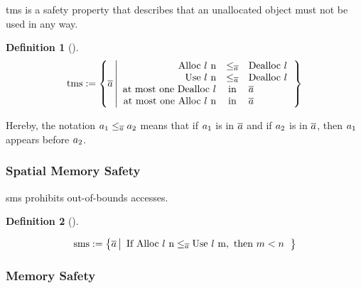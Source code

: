 \documentclass[dvipsnames,conference]{IEEEtran}
\theoremstyle{definition}
\newtheorem{definition}{Definition}[section]
\begin{document}
\gls*{tms} is a safety property that describes that an unallocated object must not be used in any way.

\begin{definition}[]\label{def:trace:tmsdef}
  $$
  \tmssafe:=\left\{\trace \left| \begin{array}{rcl}
                              \ev{Alloc\ \loc\ n}&\le_{\trace}&\ev{Dealloc\ \loc} \\
                              \ev{Use\ \loc\ n}&\le_{\trace}&\ev{Dealloc\ \loc} \\
                              \text{at most one }\ev{Dealloc\ \loc}&\text{in}&\trace \\
                              \text{at most one }\ev{Alloc\ \loc\ n}&\text{in}&\trace \\
                            \end{array}\right.\right\}
  $$
\end{definition}
Hereby, the notation $\event[_{1}]\le_{\trace}\event[_{2}]$ means that if $\event[_{1}]$ is in $\trace$ and if $\event[_{2}]$ is in $\trace$, then $\event[_{1}]$ appears before $\event[_{2}]$.

\subsubsection{Spatial Memory Safety}

\gls*{sms} prohibits out-of-bounds accesses.

\begin{definition}[]\label{def:trace:smsdef}

  \noindent
  $$
  \smssafe:=\left\{\trace \left|\begin{array}{rcl}
                                  \text{If }\ev{Alloc\ \loc\ n}\le_{\trace}\ev{Use\ \loc\ m}, \text{ then }m<n
                                \end{array}\right.\right\}
                                $$
\end{definition}

\subsubsection{Memory Safety}
\end{document}
